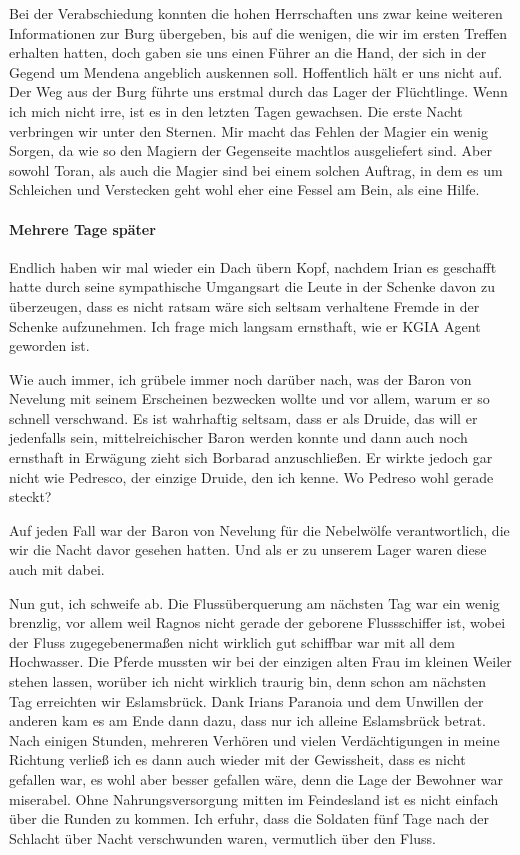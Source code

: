 Bei der Verabschiedung konnten die hohen Herrschaften uns zwar keine weiteren Informationen zur Burg übergeben, bis auf die wenigen, die wir im ersten Treffen erhalten hatten, doch gaben sie uns einen Führer an die Hand, der sich in der Gegend um Mendena angeblich auskennen soll. Hoffentlich hält er uns nicht auf.
Der Weg aus der Burg führte uns erstmal durch das Lager der Flüchtlinge. Wenn ich mich nicht irre, ist es in den letzten Tagen gewachsen.
Die erste Nacht verbringen wir unter den Sternen. Mir macht das Fehlen der Magier ein wenig Sorgen, da wie so den Magiern der Gegenseite machtlos ausgeliefert sind. Aber sowohl Toran, als auch die Magier sind bei einem solchen Auftrag, in dem es um Schleichen und Verstecken geht wohl eher eine Fessel am Bein, als eine Hilfe.

\paragraph{Mehrere Tage später}
Endlich haben wir mal wieder ein Dach übern Kopf, nachdem Irian es geschafft hatte durch seine sympathische Umgangsart die Leute in der Schenke davon zu überzeugen, dass es nicht ratsam wäre sich seltsam verhaltene Fremde in der Schenke aufzunehmen. Ich frage mich langsam ernsthaft, wie er KGIA Agent geworden ist.

Wie auch immer, ich grübele immer noch darüber nach, was der Baron von Nevelung mit seinem Erscheinen bezwecken wollte und vor allem, warum er so schnell verschwand. Es ist wahrhaftig seltsam, dass er als Druide, das will er jedenfalls sein, mittelreichischer Baron werden konnte und dann auch noch ernsthaft in Erwägung zieht sich Borbarad anzuschließen. Er wirkte jedoch gar nicht wie Pedresco, der einzige Druide, den ich kenne. Wo Pedreso wohl gerade steckt?

Auf jeden Fall war der Baron von Nevelung für die Nebelwölfe verantwortlich, die wir die Nacht davor gesehen hatten. Und als er zu unserem Lager waren diese auch mit dabei.

Nun gut, ich schweife ab. Die Flussüberquerung am nächsten Tag war ein wenig brenzlig, vor allem weil Ragnos nicht gerade der geborene Flussschiffer ist, wobei der Fluss zugegebenermaßen nicht wirklich gut schiffbar war mit all dem Hochwasser. Die Pferde mussten wir bei der einzigen alten Frau im kleinen Weiler stehen lassen, worüber ich nicht wirklich traurig bin, denn schon am nächsten Tag erreichten wir Eslamsbrück. Dank Irians Paranoia und dem Unwillen der anderen kam es am Ende dann dazu, dass nur ich alleine Eslamsbrück betrat. Nach einigen Stunden, mehreren Verhören und vielen Verdächtigungen in meine Richtung verließ ich es dann auch wieder mit der Gewissheit, dass es nicht gefallen war, es wohl aber besser gefallen wäre, denn die Lage der Bewohner war miserabel. Ohne Nahrungsversorgung mitten im Feindesland ist es nicht einfach über die Runden zu kommen. Ich erfuhr, dass die Soldaten fünf Tage nach der Schlacht über Nacht verschwunden waren, vermutlich über den Fluss.

